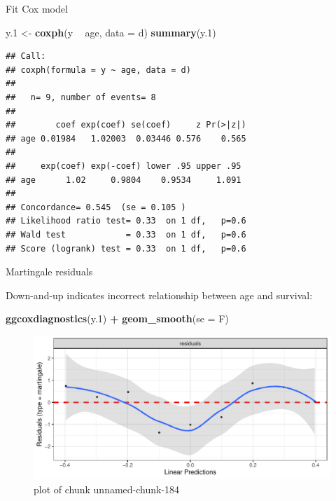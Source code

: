 \documentclass[ignorenonframetext,]{beamer}
\newenvironment{Shaded}{\begin{snugshade}}{\end{snugshade}}
\newcommand{\DataTypeTok}[1]{\textcolor[rgb]{0.13,0.29,0.53}{#1}}
\newcommand{\FloatTok}[1]{\textcolor[rgb]{0.00,0.00,0.81}{#1}}
\newcommand{\KeywordTok}[1]{\textcolor[rgb]{0.13,0.29,0.53}{\textbf{#1}}}
\newcommand{\NormalTok}[1]{#1}
\newcommand{\OperatorTok}[1]{\textcolor[rgb]{0.81,0.36,0.00}{\textbf{#1}}}
\newcommand{\StringTok}[1]{\textcolor[rgb]{0.31,0.60,0.02}{#1}}
\begin{document}
\begin{frame}[fragile]{Fit Cox model}
\protect\hypertarget{fit-cox-model}{}

\footnotesize

\begin{Shaded}
\begin{Highlighting}[]
\NormalTok{y}\FloatTok{.1}\NormalTok{ <-}\StringTok{ }\KeywordTok{coxph}\NormalTok{(y }\OperatorTok{~}\StringTok{ }\NormalTok{age, }\DataTypeTok{data =}\NormalTok{ d)}
\KeywordTok{summary}\NormalTok{(y}\FloatTok{.1}\NormalTok{)}
\end{Highlighting}
\end{Shaded}

\begin{verbatim}
## Call:
## coxph(formula = y ~ age, data = d)
## 
##   n= 9, number of events= 8 
## 
##        coef exp(coef) se(coef)     z Pr(>|z|)
## age 0.01984   1.02003  0.03446 0.576    0.565
## 
##     exp(coef) exp(-coef) lower .95 upper .95
## age      1.02     0.9804    0.9534     1.091
## 
## Concordance= 0.545  (se = 0.105 )
## Likelihood ratio test= 0.33  on 1 df,   p=0.6
## Wald test            = 0.33  on 1 df,   p=0.6
## Score (logrank) test = 0.33  on 1 df,   p=0.6
\end{verbatim}

\normalsize

\end{frame}

\begin{frame}[fragile]{Martingale residuals}
\protect\hypertarget{martingale-residuals}{}

Down-and-up indicates incorrect relationship between age and survival:

\begin{Shaded}
\begin{Highlighting}[]
\KeywordTok{ggcoxdiagnostics}\NormalTok{(y}\FloatTok{.1}\NormalTok{) }\OperatorTok{+}\StringTok{ }\KeywordTok{geom_smooth}\NormalTok{(}\DataTypeTok{se =}\NormalTok{ F)}
\end{Highlighting}
\end{Shaded}

\begin{figure}
\centering
\includegraphics{figure/unnamed-chunk-184-1.pdf}
\caption{plot of chunk unnamed-chunk-184}
\end{figure}

\end{frame}
\end{document}
